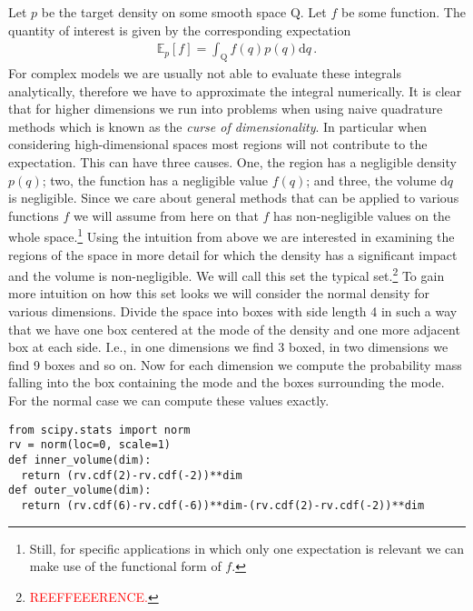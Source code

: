 Let $p$ be the target density on some smooth space $\mathrm{Q}$.
Let $f$ be some function.
The quantity of interest is given by the corresponding expectation
\begin{align}
    \mathbb{E}_p \left[f\right] = \int_{\mathrm{Q}} f(q) p(q) \mathrm{d}q \,.
\end{align}
For complex models we are usually not able to evaluate these integrals analytically,
therefore we have to approximate the integral numerically.
It is clear that for higher dimensions we run into problems when using naive
quadrature methods which is known as the \emph{curse of dimensionality}.
In particular when considering high-dimensional spaces most regions will not
contribute to the expectation. This can have three causes. One, the region has a
negligible density $p(q)$; two, the function has a negligible value $f(q)$;
and three, the volume $\mathrm{d}q$ is negligible. Since we care about general
methods that can be applied to various functions $f$ we will assume from here on
that $f$ has non-negligible values on the whole space.\footnote{Still, for specific applications
in which only one expectation is relevant we can make use of the functional form of
$f$.}
Using the intuition from above we are interested in examining the regions of the
space in more detail for which the density has a significant impact and the
volume is non-negligible. We will call this set the typical set.\footnote{\textcolor{red}{REEFFEEERENCE.}}
To gain more intuition on how this set looks we will consider the normal density
for various dimensions. Divide the space into boxes with
side length 4 in such a way that we have one box centered at the mode of the
density and one more adjacent box at each side. I.e., in one dimensions we
find 3 boxed, in two dimensions we find 9 boxes and so on. Now for each dimension
we compute the probability mass falling into the box containing the mode and the
boxes surrounding the mode. For the normal case we can compute these values exactly.

\begin{lstlisting}
from scipy.stats import norm
rv = norm(loc=0, scale=1)
def inner_volume(dim):
  return (rv.cdf(2)-rv.cdf(-2))**dim
def outer_volume(dim):
  return (rv.cdf(6)-rv.cdf(-6))**dim-(rv.cdf(2)-rv.cdf(-2))**dim
\end{lstlisting}


